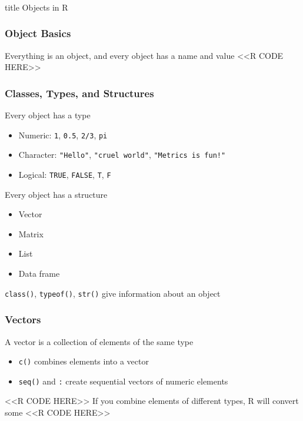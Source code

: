 \documentclass{beamer}
\begin{document}
\begin{frame}\frametitle{}
    \vfill
    \centering
    \begin{beamercolorbox}[center]{title}
        \Large Objects in R
    \end{beamercolorbox}
    \vfill
\end{frame}

\begin{frame}[fragile]\frametitle{Object Basics}
    Everything is an object, and every object has a name and value
    <<R CODE HERE>>
\end{frame}

\begin{frame}\frametitle{Classes, Types, and Structures}
    Every object has a type
    \begin{itemize}
        \item Numeric: \texttt{1}, \texttt{0.5}, \texttt{2/3}, \texttt{pi}
        \item Character: \texttt{"Hello"}, \texttt{"cruel world"}, \texttt{"Metrics is fun!"}
        \item Logical: \texttt{TRUE}, \texttt{FALSE}, \texttt{T}, \texttt{F}
    \end{itemize}
    \vspace{2ex}
    Every object has a structure
    \begin{itemize}
        \item Vector
        \item Matrix
        \item List
        \item Data frame
    \end{itemize}
    \vspace{2ex}
    \texttt{class()}, \texttt{typeof()}, \texttt{str()} give information about an object
\end{frame}

\begin{frame}[fragile]\frametitle{Vectors}
    A vector is a collection of elements of the same type
    \begin{itemize}
        \item \texttt{c()} combines elements into a vector
        \item \texttt{seq()} and \texttt{:} create sequential vectors of numeric elements
    \end{itemize}
    <<R CODE HERE>>
    \vspace{2ex} 
    If you combine elements of different types, R will convert some
    <<R CODE HERE>>
\end{frame}
\end{document}
